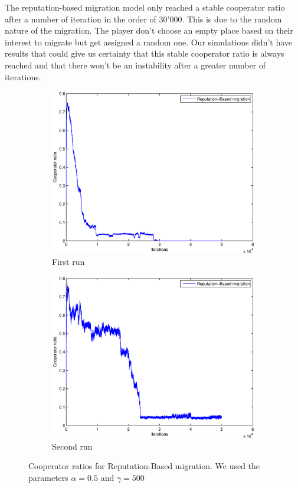 \documentclass[11pt]{article}
\begin{document}
The reputation-based migration model only reached a stable cooperator ratio after a number of iteration in the order of 30'000. This is due to the random nature of the migration. The player don't choose an empty place based on their interest to migrate but get assigned a random one. Our simulations didn't have results that could give us certainty that this stable cooperator ratio is always reached and that there won't be an instability after a greater number of iterations.

\begin{figure}
	\centering
	\begin{subfigure}[t]{0.48\textwidth}
        \includegraphics[width=\textwidth]{../../other/plots/convergence-50000.eps}
	\caption{First run}
    	\end{subfigure}
	\begin{subfigure}[t]{0.48\textwidth}
        \includegraphics[width=\textwidth]{../../other/plots/convergence-50000-2.eps}
	\caption{Second run}
    	\end{subfigure}

	\caption{Cooperator ratios for Reputation-Based migration. We used the parameters $\alpha = 0.5$ and $\gamma = 500$}
	\label{fig:convergence_reputation}
\end{figure}
\end{document}
